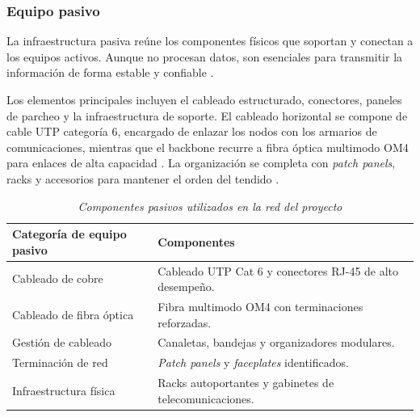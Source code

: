 \subsubsection{Equipo pasivo}

La infraestructura pasiva reúne los componentes físicos que soportan y conectan a los equipos activos. Aunque no procesan datos, son esenciales para transmitir la información de forma estable y confiable \parencite{cisneros2021infraestructura}.

Los elementos principales incluyen el cableado estructurado, conectores, paneles de parcheo y la infraestructura de soporte. El cableado horizontal se compone de cable UTP categoría 6, encargado de enlazar los nodos con los armarios de comunicaciones, mientras que el backbone recurre a fibra óptica multimodo OM4 para enlaces de alta capacidad \parencite{systimax2020structured}. La organización se completa con \textit{patch panels}, racks y accesorios para mantener el orden del tendido \parencite{flukenetworks2022cablemanagement}.

\begin{table}[H]
	\caption{\textit{Componentes pasivos utilizados en la red del proyecto}}
	\label{tab:equipos_pasivos}
	\centering
	\begin{tabularx}{0.95\textwidth}{lX}
			\toprule
			\textbf{Categoría de equipo pasivo} & \textbf{Componentes} \\
		\midrule
		Cableado de cobre & Cableado UTP Cat 6 y conectores RJ-45 de alto desempeño. \\
		Cableado de fibra óptica & Fibra multimodo OM4 con terminaciones reforzadas. \\
		Gestión de cableado & Canaletas, bandejas y organizadores modulares. \\
		Terminación de red & \textit{Patch panels} y \textit{faceplates} identificados. \\
		Infraestructura física & Racks autoportantes y gabinetes de telecomunicaciones. \\
		\bottomrule
	\end{tabularx}
\end{table}
